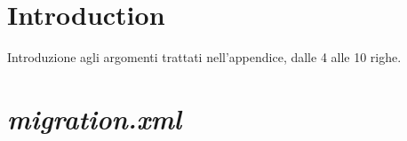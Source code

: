 \section{Introduction}
Introduzione agli argomenti trattati nell'appendice, dalle 4 alle 10 righe.

\section{\textit{migration.xml}}

